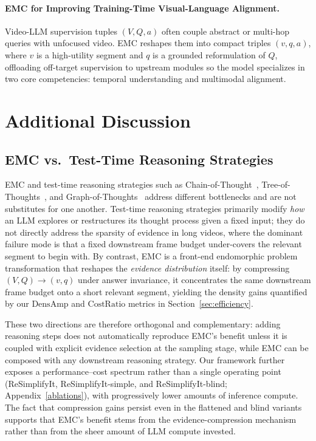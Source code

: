 \paragraph{EMC for Improving Training-Time Visual-Language Alignment.}
Video-LLM supervision tuples $(V, Q, a)$ often couple abstract or multi-hop queries with unfocused video. EMC reshapes them into compact triples $(v, q, a)$, where $v$ is a high-utility segment and $q$ is a grounded reformulation of $Q$, offloading off-target supervision to upstream modules so the model specializes in two core competencies: temporal understanding and multimodal alignment.


\section{Additional Discussion}
\label{appendix:discussion}

\subsection{EMC vs.\ Test-Time Reasoning Strategies}
\label{appendix:discussion_orthogonality}

EMC and test-time reasoning strategies such as Chain-of-Thought~\citep{wei2022chain}, Tree-of-Thoughts~\citep{yao2023tree}, and Graph-of-Thoughts~\citep{besta2024graph} address different bottlenecks and are not substitutes for one another. Test-time reasoning strategies primarily modify \textit{how} an LLM explores or restructures its thought process given a fixed input; they do not directly address the sparsity of evidence in long videos, where the dominant failure mode is that a fixed downstream frame budget under-covers the relevant segment to begin with. By contrast, EMC is a front-end endomorphic problem transformation that reshapes the \textit{evidence distribution} itself: by compressing $(V,Q) \to (v,q)$ under answer invariance, it concentrates the same downstream frame budget onto a short relevant segment, yielding the density gains quantified by our $\mathrm{DensAmp}$ and $\mathrm{CostRatio}$ metrics in Section~\ref{sec:efficiency}.

These two directions are therefore orthogonal and complementary: adding reasoning steps does not automatically reproduce EMC's benefit unless it is coupled with explicit evidence selection at the sampling stage, while EMC can be composed with any downstream reasoning strategy. Our framework further exposes a performance--cost spectrum rather than a single operating point (ReSimplifyIt, ReSimplifyIt-simple, and ReSimplifyIt-blind; Appendix~\ref{ablations}), with progressively lower amounts of inference compute. The fact that compression gains persist even in the flattened and blind variants supports that EMC's benefit stems from the evidence-compression mechanism rather than from the sheer amount of LLM compute invested.

